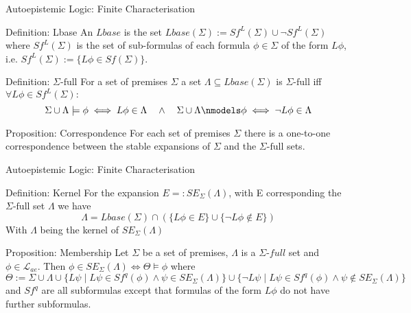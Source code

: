 \documentclass[usenames,dvipsnames, 8pt]{beamer}
\let\lneg\neg
\begin{document}
\begin{frame}{Autoepistemic Logic: Finite Characterisation}


\begin{block}{Definition: Lbase}
An $Lbase$ is the set $Lbase(\Sigma):= Sf^L(\Sigma) \cup \neg Sf^L(\Sigma)$ where $Sf^L(\Sigma)$ is the set of sub-formulas of each formula $\phi \in \Sigma$ of the form $L \phi $, i.e.  $Sf^L(\Sigma):=\{L \phi \in Sf(\Sigma)\}$.

\end{block}


\begin{block}{Definition: $\Sigma\text{-full}$}
For a set of premises $\Sigma$ a set $\Lambda \subseteq Lbase(\Sigma)$ is $\Sigma\text{-full}$ iff $\forall L\phi \in Sf^L(\Sigma):$
\begin{equation*}
\Sigma \cup \Lambda \models \phi \iff L\phi \in \Lambda \quad \land  \quad \Sigma \cup \Lambda \nmodels  \phi \iff \lneg L\phi \in \Lambda
\end{equation*}
\end{block}

\begin{block}{Proposition: Correspondence}
For each set of premises $\Sigma$ there is a one-to-one correspondence between the stable expansions of $\Sigma$  and the $\Sigma\text{-full}$ sets.
\end{block}

\end{frame}



\begin{frame}{Autoepistemic Logic: Finite Characterisation}

\begin{block}{Definition: Kernel}
For the expansion $E=:SE_{\Sigma}(\Lambda)$, with E corresponding the $\Sigma\text{-full}$ set $\Lambda$ we have
\begin{equation*}
\Lambda = Lbase(\Sigma) \cap (\{L\phi \in E\} \cup \{\lneg L\phi \nin E\})
\end{equation*}
With $\Lambda$ being the kernel of $SE_{\Sigma}(\Lambda)$
\end{block}

\begin{block}{Proposition: Membership}
Let $\Sigma$ be a set of premises, $\Lambda$ is a $\Sigma\textit{-full}$ set
and $\phi \in \mathcal{L}_{ae}$. Then $\phi \in SE_{\Sigma}(\Lambda) \iff \Theta \models \phi$
where
\begin{equation*}
\Theta := \Sigma \cup  \Lambda \cup \{L\psi \mid L\psi \in Sf^q(\phi) \land \psi \in SE_{\Sigma}(\Lambda)\} \cup \{\lneg L\psi \mid L\psi \in Sf^q(\phi) \land \psi \nin SE_{\Sigma}(\Lambda)\}
\end{equation*}
and $Sf^q$ are all subformulas except that formulas of the form $L\phi$ do not have further subformulas.
\end{block}

\end{frame}
\end{document}
